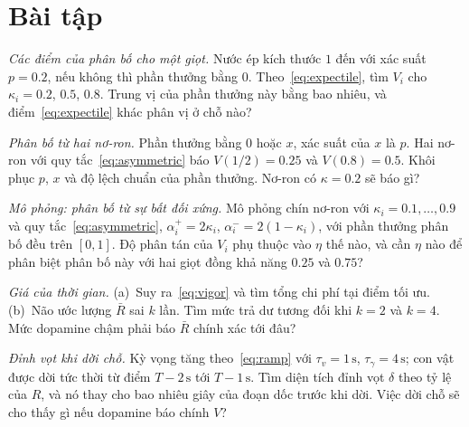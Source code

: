 \section{Bài tập}

\begin{exercise}[\lvlA]
\label{ex:07:1}
\emph{Các điểm của phân bố cho một giọt.} Nước ép kích thước $1$ đến với xác suất $p=0.2$, nếu không thì phần thưởng bằng $0$. Theo~\eqref{eq:expectile}, tìm $V_i$ cho $\kappa_i=0.2$, $0.5$, $0.8$. Trung vị của phần thưởng này bằng bao nhiêu, và điểm~\eqref{eq:expectile} khác phân vị ở chỗ nào?
\end{exercise}

\begin{exercise}[\lvlB]
\label{ex:07:2}
\emph{Phân bố từ hai nơ-ron.} Phần thưởng bằng $0$ hoặc $x$, xác suất của $x$ là $p$. Hai nơ-ron với quy tắc~\eqref{eq:asymmetric} báo $V(1/2)=0.25$ và $V(0.8)=0.5$. Khôi phục $p$, $x$ và độ lệch chuẩn của phần thưởng. Nơ-ron có $\kappa=0.2$ sẽ báo gì?
\end{exercise}

\begin{exercise}[\lvlB]
\label{ex:07:3}
\emph{Mô phỏng: phân bố từ sự bất đối xứng.} Mô phỏng chín nơ-ron  với $\kappa_i=0.1,\dots,0.9$ và quy tắc~\eqref{eq:asymmetric}, $\alpha_i^+=2\kappa_i$, $\alpha_i^-=2(1-\kappa_i)$, với phần thưởng phân bố đều trên $[0,1]$. Độ phân tán của $V_i$ phụ thuộc vào $\eta$ thế nào, và cần $\eta$ nào để phân biệt phân bố này với hai giọt đồng khả năng $0.25$ và $0.75$?
\end{exercise}

\begin{exercise}[\lvlA]
\label{ex:07:4}
\emph{Giá của thời gian.} (a)~Suy ra~\eqref{eq:vigor} và tìm tổng chi phí tại điểm tối ưu. (b)~Não ước lượng $\bar R$ sai $k$ lần. Tìm mức trả dư tương đối khi $k=2$ và $k=4$. Mức dopamine chậm phải báo $\bar R$ chính xác tới đâu?
\end{exercise}

\begin{exercise}[\lvlB]
\label{ex:07:5}
\emph{Đỉnh vọt khi dời chỗ.} Kỳ vọng tăng theo~\eqref{eq:ramp} với $\tau_v=1\,\text{s}$, $\tau_\gamma=4\,\text{s}$; con vật được dời tức thời từ điểm $T-2\,\text{s}$ tới $T-1\,\text{s}$. Tìm diện tích đỉnh vọt $\delta$ theo tỷ lệ của $R$, và nó thay cho bao nhiêu giây của đoạn dốc trước khi dời. Việc dời chỗ sẽ cho thấy gì nếu dopamine báo chính $V$?
\end{exercise}

